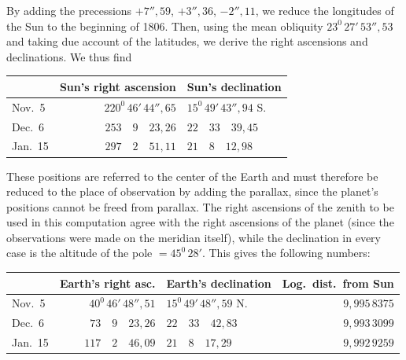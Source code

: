 By adding the precessions $+7''{,}59$, $+3''{,}36$, $-2''{,}11$, we reduce the longitudes of the Sun to the beginning of 1806. Then, using the mean obliquity $23^{0}\,27'\,53''{,}53$ and taking due account of the latitudes, we derive the right ascensions and declinations. We thus find
\begin{center}
\begingroup\small\setlength{\tabcolsep}{5pt}\renewcommand{\arraystretch}{1.2}
\begin{tabular}{|l|r|l|}\hline
& Sun's right ascension & Sun's declination\\\hline
Nov.\ 5 & $220^{0}\,46'\,44''{,}65$ & $15^{0}\,49'\,43''{,}94$ S.\\
Dec.\ 6 & $253\quad9\quad23{,}26$ & $22\quad33\quad39{,}45$\\
Jan.\ 15 & $297\quad2\quad51{,}11$ & $21\quad8\quad12{,}98$\\\hline
\end{tabular}\endgroup
\end{center}

These positions are referred to the center of the Earth and must therefore be reduced to the place of observation by adding the parallax, since the planet's positions cannot be freed from parallax. The right ascensions of the zenith to be used in this computation agree with the right ascensions of the planet (since the observations were made on the meridian itself), while the declination in every case is the altitude of the pole $=45^{0}\,28'$. This gives the following numbers:
\begin{center}
\begingroup\footnotesize\setlength{\tabcolsep}{3pt}\renewcommand{\arraystretch}{1.2}
\begin{tabular}{|l|r|l|r|}\hline
& Earth's right asc. & Earth's declination & Log.\ dist.\ from Sun\\\hline
Nov.\ 5 & $40^{0}\,46'\,48''{,}51$ & $15^{0}\,49'\,48''{,}59$ N. & $9{,}995\,8375$\\
Dec.\ 6 & $73\quad9\quad23{,}26$ & $22\quad33\quad42{,}83$ & $9{,}993\,3099$\\
Jan.\ 15 & $117\quad2\quad46{,}09$ & $21\quad8\quad17{,}29$ & $9{,}992\,9259$\\\hline
\end{tabular}\endgroup
\end{center}

